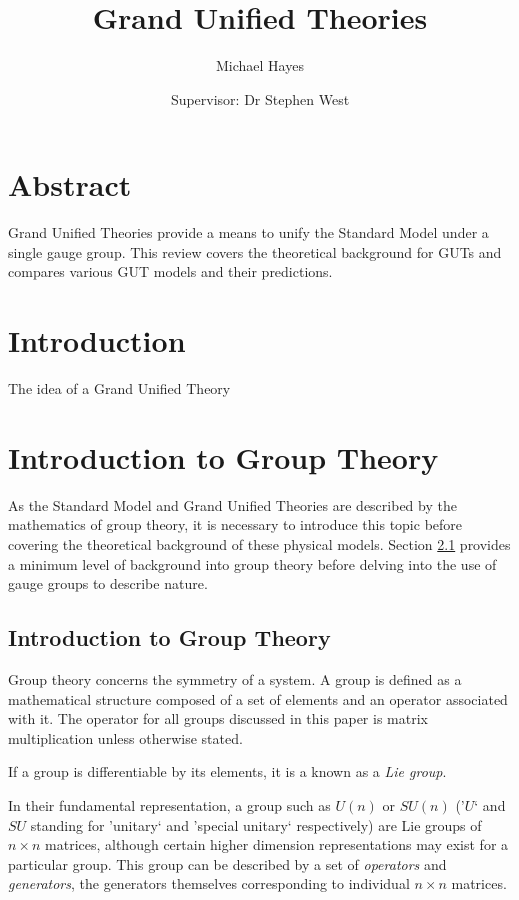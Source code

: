 \documentclass{article}
\title{Grand Unified Theories}
\author{Michael Hayes}
\date{Supervisor: Dr Stephen West}
\begin{document}
\maketitle

\section*{Abstract}
\addtocounter{section}{1}

Grand Unified Theories provide a means to unify the Standard Model under a single gauge group. This review covers the theoretical background for GUTs and compares various GUT models and their predictions.

\clearpage
\tableofcontents
\section{Introduction}%
The idea of a Grand Unified Theory

\section{Introduction to Group Theory} %
\label{sec:intro}
As the Standard Model and Grand Unified Theories are described by the mathematics of group theory, it is necessary to introduce this topic before covering the theoretical background of these physical models. Section \ref{sec:intro_gt} provides a minimum level of background into group theory before delving into the use of gauge groups to describe nature.
\subsection{Introduction to Group Theory}%
\label{sec:intro_gt}
Group theory concerns the symmetry of a system. A group is defined as a mathematical structure composed of a set of elements and an operator associated with it. The operator for all groups discussed in this paper is matrix multiplication unless otherwise stated. 

If a group is differentiable by its elements, it is a known as a \textit{Lie group}. 

In their fundamental representation, a group such as $U(n)$ or $SU(n)$ ('$U$` and $SU$ standing for 'unitary` and 'special unitary` respectively) are Lie groups of $n\times n$ matrices, although certain higher dimension representations may exist for a particular group. This group can be described by a set of \textit{operators} and \textit{generators}, the generators themselves corresponding to individual $n\times n$ matrices.
\end{document}
